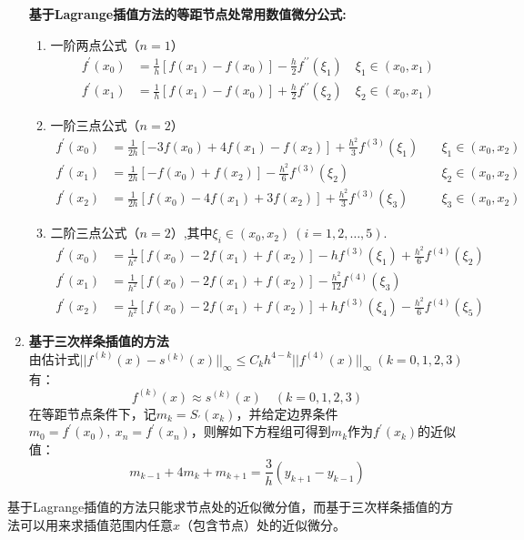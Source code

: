 \begin{enumerate}
        \textbf{基于Lagrange插值方法的等距节点处常用数值微分公式:}
        \begin{enumerate}
            \item 一阶两点公式（$n=1$）
                \begin{align}
                    f^{\prime}(x_0) &= \frac{1}{h}[f(x_1)-f(x_0)] - \frac{h}{2}f^{\prime \prime}(\xi_1) \quad \xi_1 \in (x_0,x_1) \\[3mm]
                    f^{\prime}(x_1) &= \frac{1}{h}[f(x_1)-f(x_0)] + \frac{h}{2}f^{\prime \prime}(\xi_2) \quad \xi_2 \in (x_0,x_1)
                \end{align}
            \item 一阶三点公式（$n=2$）
            \begin{align}
                f^{\prime}(x_0) &= \frac{1}{2h}[-3f(x_0)+4f(x_1)-f(x_2)] + \frac{h^2}{3}f^{(3)}(\xi_1) \quad &\xi_1 \in (x_0,x_2) \\[3mm]
                f^{\prime}(x_1) &= \frac{1}{2h}[-f(x_0)+f(x_2)] - \frac{h^2}{6}f^{(3)}(\xi_2) \quad &\xi_2 \in (x_0,x_2) \\[3mm]
                f^{\prime}(x_2) &= \frac{1}{2h}[f(x_0)-4f(x_1)+3f(x_2)] + \frac{h^2}{3}f^{(3)}(\xi_3) \quad &\xi_3 \in (x_0,x_2)
            \end{align}
            \item 二阶三点公式（$n=2$）,其中$\xi_i \in (x_0,x_2)\ (i=1,2,\dots,5)$.
            \begin{align}
                f^{\prime}(x_0) &= \frac{1}{h^2}[f(x_0)-2f(x_1)+f(x_2)] -hf^{(3)}(\xi_1) + \frac{h^2}{6}f^{(4)}(\xi_2) \\[3mm]
                f^{\prime}(x_1) &= \frac{1}{h^2}[f(x_0)-2f(x_1)+f(x_2)] - \frac{h^2}{12}f^{(4)}(\xi_3) \\[3mm]
                f^{\prime}(x_2) &= \frac{1}{h^2}[f(x_0)-2f(x_1)+f(x_2)] + hf^{(3)}(\xi_4) - \frac{h^2}{6}f^{(4)}(\xi_5) 
            \end{align}
        \end{enumerate}
    \item \textbf{基于三次样条插值的方法}\\
        由估计式$\left|\right| f^{(k)}(x)-s^{(k)}(x) \left| \right|_{\infty} \leqslant C_k h^{4-k}\left|\right| f^{(4)}(x)\left|\right|_{\infty}\ (k=0,1,2,3)$有：
        \begin{equation}
            f^{(k)}(x) \approx s^{(k)}(x) \quad (k=0,1,2,3)
        \end{equation}
        在等距节点条件下，记$m_k=S_{\prime}(x_k)$，并给定边界条件$m_0=f^{\prime}(x_0),\ x_n=f^{\prime}(x_n)$，则解如下方程组可得到$m_k$作为$f^{\prime}(x_k)$的近似值：
        \begin{equation}
            m_{k-1} + 4m_k + m_{k+1} = \frac{3}{h} (y_{k+1} - y_{k-1})
        \end{equation}
\end{enumerate}

基于Lagrange插值的方法只能求节点处的近似微分值，而基于三次样条插值的方法可以用来求插值范围内任意$x$（包含节点）处的近似微分。


% 

